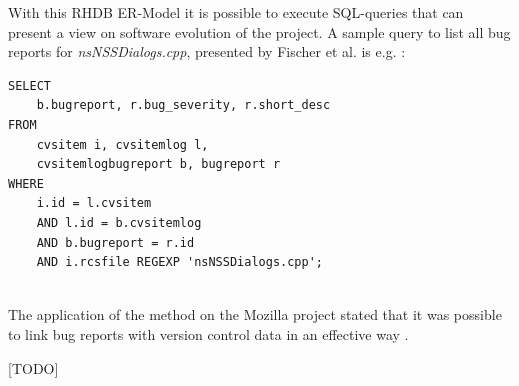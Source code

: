 With this RHDB ER-Model it is possible to execute SQL-queries that can present a view on software evolution of the project. A sample query to list all bug reports for \textit{nsNSSDialogs.cpp}, presented by Fischer et al. is e.g. \cite{fischer2003populating}:

\begin{verbatim}
SELECT
	b.bugreport, r.bug_severity, r.short_desc
FROM
	cvsitem i, cvsitemlog l,
	cvsitemlogbugreport b, bugreport r
WHERE 	
	i.id = l.cvsitem
	AND l.id = b.cvsitemlog
	AND b.bugreport = r.id
	AND i.rcsfile REGEXP 'nsNSSDialogs.cpp';
	
\end{verbatim}

The application of the method on the Mozilla project stated that it was possible to link bug reports with version control data in an effective way \cite{fischer2003populating}. 


[TODO]
